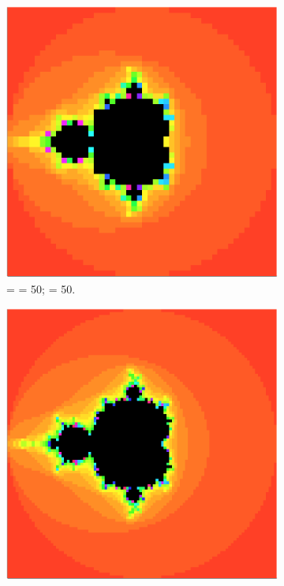 \begin{figure}
    \centering
    \begin{subfigure}[t]{0.3\textwidth}
        \centering
        \includegraphics[scale=0.15]{../figures/fractal-n050-mx050}
        \caption{ =  = 50;  = 50.}
    \end{subfigure}
    \begin{subfigure}[t]{0.3\textwidth}
        \centering
        \includegraphics[scale=0.15]{../figures/fractal-n100-mx050}

\end{subfigure}
\end{figure}
